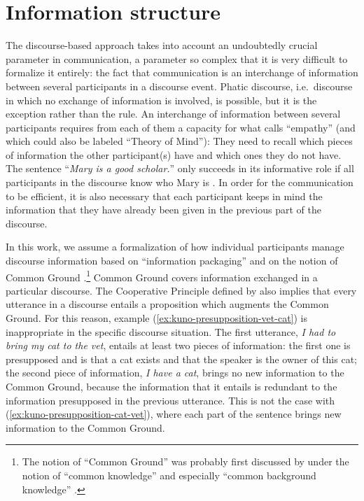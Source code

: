\section{Information structure}
\label{ch:is}

The discourse-based approach takes into account an undoubtedly crucial parameter in communication, a parameter so complex that it is very difficult to formalize it entirely: the fact that communication is an interchange of information between several participants in a discourse event. Phatic discourse, i.e.\ discourse in which no exchange of information is involved, is possible, but it is the exception rather than the rule. An interchange of information between several participants requires from each of them a capacity for what \citet{Kuno.1976} calls ``empathy'' (and which could also be labeled ``Theory of Mind''): They need to recall which pieces of information the other participant(s) have and which ones they do not have. The sentence ``\emph{Mary is a good scholar.}'' only succeeds in its informative role if all participants in the discourse know who Mary is \citep[309]{Kuno.1972}. In order for the communication to be efficient, it is also necessary that each participant keeps in mind the information that they have already been given in the previous part of the discourse.

In this work, we assume a formalization of how individual participants manage discourse information based on ``information packaging'' \citep{Chafe.1976} and on the notion of Common Ground \citep{Krifka.2007}.\footnote{The notion of ``Common Ground'' was probably first discussed by \citeauthor{Stalnaker.1978} under the notion of ``common knowledge'' and especially ``common background knowledge'' \citep[86]{Stalnaker.1978}.} %
Common Ground covers information exchanged in a particular discourse. The Cooperative Principle defined by \citet{Grice.1975} also implies that every utterance in a discourse entails a proposition which augments the Common Ground. For this reason, example (\ref{ex:kuno-presupposition-vet-cat}) is inappropriate in the specific discourse situation. The first utterance, \emph{I had to bring my cat to the vet}, entails at least two pieces of information: the first one is presupposed and is that a cat exists and that the speaker is the owner of this cat; the second piece of information, \emph{I have a cat}, brings no new information to the Common Ground, because the information that it entails is redundant to the information presupposed in the previous utterance. This is not the case with (\ref{ex:kuno-presupposition-cat-vet}), where each part of the sentence brings new information to the Common Ground. 

